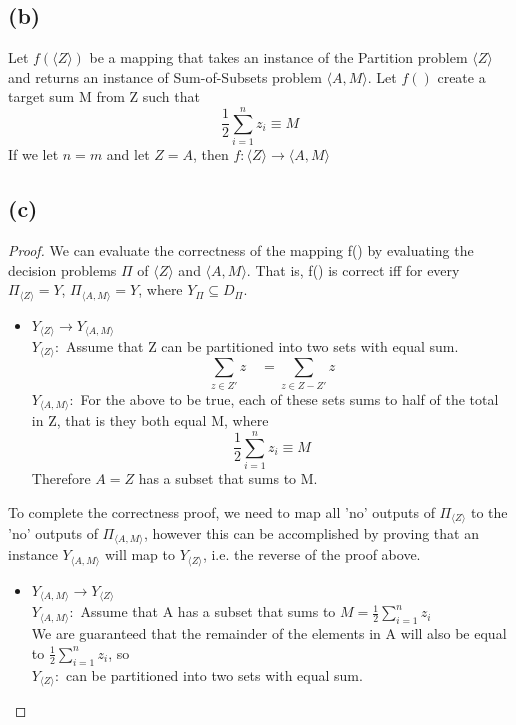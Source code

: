 	\subsection*{(b)}
		
		Let $f(\langle Z \rangle)$ be a mapping that takes an instance of the Partition problem $\langle Z \rangle$ and returns an instance of Sum-of-Subsets problem $\langle A, M \rangle$. Let $f()$ create a target sum M from Z such that \[ \frac{1}{2}\sum_{i=1}^{n} z_i\equiv M\] If we let $n=m$ and let $Z = A$, then $f:\langle Z \rangle \rightarrow \langle A,M\rangle$
		\subsection*{(c)}
		\begin{proof}
			We can evaluate the correctness of the mapping f() by evaluating the decision problems $\Pi$ of $\langle Z \rangle$ and $\langle A, M \rangle$. That is, f() is correct iff for every $\Pi_{\langle Z \rangle} = Y$, $\Pi_{\langle A, M \rangle} = Y$, where $Y_{\Pi}\subseteq D_{\Pi}$. 
			\begin{itemize}
				\item $Y_{\langle Z \rangle} \rightarrow Y_{\langle A, M \rangle}$\\
					\vspace{-0.25cm}
					$Y_{\langle Z \rangle} :$ Assume that Z can be partitioned into two sets with equal sum.
					\[ \sum_{z\in Z'} z \quad= \sum_{z\in Z-Z'}z \]
					 $Y_{\langle A, M \rangle} :$ For the above to be true, each of these sets sums to half of the total in Z, that is they both equal M, where 
					\[ \frac{1}{2}\sum_{i=1}^{n} z_i \equiv M\]
					Therefore $A = Z$ has a subset that sums to M. 
			\end{itemize}
			To complete the correctness proof, we need to map all 'no' outputs of $\Pi_{\langle Z \rangle}$ to the 'no' outputs of $\Pi_{\langle A,M \rangle}$, however this can be accomplished by proving that an instance $Y_{\langle A, M \rangle}$ will map to $Y_{\langle Z \rangle}$, i.e. the reverse of the proof above. 
			\begin{itemize}
				\item $Y_{\langle A, M \rangle} \rightarrow Y_{\langle Z \rangle} $\\
				\vspace{-0.25cm}
					$Y_{\langle A,M \rangle} :$ Assume that A has a subset that sums to $M = \frac{1}{2}\sum_{i=1}^{n} z_i$\\
					
					\noindent
					We are guaranteed that the remainder of the elements in A will also be equal to $\frac{1}{2}\sum_{i=1}^{n} z_i$, so\\
					$Y_{\langle Z \rangle} :$ can be partitioned into two sets with equal sum.  
			\end{itemize}
		\end{proof}
